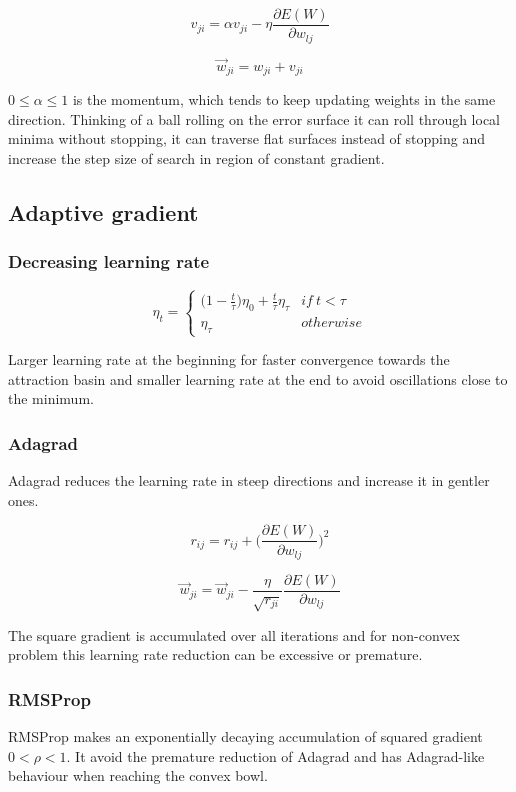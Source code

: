 		$$v_{ji} = \alpha v_{ji}-\eta\frac{\partial E(W)}{\partial w_{lj}}$$

		$$\vec{w}_{ji} = w_{ji} + v_{ji}$$

		$0\le \alpha\le 1$ is the momentum, which tends to keep updating weights in the same direction.
		Thinking of a ball rolling on the error surface it can roll through local minima without stopping, it can traverse flat surfaces instead of stopping and increase the step size of search in region of constant gradient.

	\subsection{Adaptive gradient}

		\subsubsection{Decreasing learning rate}

		$$\eta_t = \begin{cases}\biggl(1-\frac{t}{\tau}\biggr)\eta_0+\frac{t}{\tau}\eta_\tau &if\ t< \tau\\ \eta_\tau & otherwise\end{cases}$$

		Larger learning rate at the beginning for faster convergence towards the attraction basin and smaller learning rate at the end to avoid oscillations close to the minimum.

		\subsubsection{Adagrad}
		Adagrad reduces the learning rate in steep directions and increase it in gentler ones.

		$$r_{ij} = r_{ij} + \biggl(\frac{\partial E(W)}{\partial w_{lj}}\biggr)^2$$

		$$\vec{w}_{ji} = \vec{w}_{ji} -\frac{\eta}{\sqrt{r_{ji}}}\frac{\partial E(W)}{\partial w_{lj}}$$

		The square gradient is accumulated over all iterations and for non-convex problem this learning rate reduction can be excessive or premature.

		\subsubsection{RMSProp}
		RMSProp makes an exponentially decaying accumulation of squared gradient $0<\rho<1$.
		It avoid the premature reduction of Adagrad and has Adagrad-like behaviour when reaching the convex bowl.

